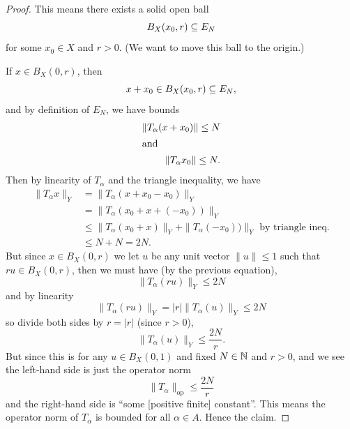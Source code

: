 \begin{proof}
This means there exists a solid open ball
\begin{equation}
B_{X}(x_{0},r)\propersubset E_{N}
\end{equation}
for some $x_{0}\in X$ and $r>0$. (We want to move this ball to the origin.)

If $x\in B_{X}(0,r)$, then
\begin{equation}
x+x_{0}\in B_{X}(x_{0},r)\propersubset E_{N},
\end{equation}
and by definition of $E_{N}$, we have bounds
\begin{subequations}
  \begin{align}
\|T_{\alpha}(x+x_{0})\|\leq N\\
\intertext{and}
\|T_{\alpha}x_{0}\|\leq N.
  \end{align}
\end{subequations}
Then by linearity of $T_{\alpha}$ and the triangle inequality, we have
\begin{subequations}
  \begin{align}
\|T_{\alpha}x\|_{Y}
&=\|T_{\alpha}(x+x_{0}-x_{0})\|_{Y}\\
&=\|T_{\alpha}(x_{0}+x+(-x_{0}))\|_{Y}\\
&\leq\|T_{\alpha}(x_{0}+x)\|_{Y}+\|T_{\alpha}(-x_{0}))\|_{Y}\mbox{ by triangle ineq.}\\
&\leq N + N=2N.
  \end{align}
\end{subequations}
But since $x\in B_{X}(0,r)$ we let $u$ be any unit vector $\|u\|\leq1$
such that $ru\in B_{X}(0,r)$, then we must have (by the previous equation),
\begin{equation}
\|T_{\alpha}(ru)\|_{Y}\leq2N
\end{equation}
and by linearity
\begin{equation}
\|T_{\alpha}(ru)\|_{Y}=|r|\|T_{\alpha}(u)\|_{Y}\leq 2N
\end{equation}
so divide both sides by $r=|r|$ (since $r>0$),
\begin{equation}
\|T_{\alpha}(u)\|_{Y}\leq\frac{2N}{r}.
\end{equation}
But since this is for any $u\in B_{X}(0,1)$ and fixed $N\in\mathbb{N}$ and $r>0$,
and we see the left-hand side is just the operator norm
\begin{equation}
\|T_{\alpha}\|_{\text{op}}\leq\frac{2N}{r}
\end{equation}
and the right-hand side is ``some [positive finite] constant''. This
means the operator norm of $T_{\alpha}$ is bounded for all $\alpha\in A$.
Hence the claim.
\end{proof}

